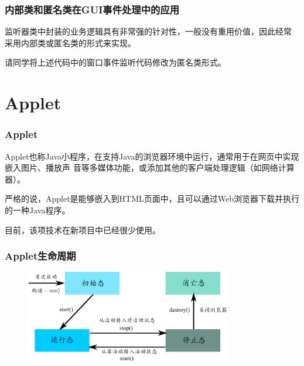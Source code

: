 \begin{frame}[fragile] %
  \frametitle{内部类和匿名类在GUI事件处理中的应用}

  监听器类中封装的业务逻辑具有非常强的针对性，一般没有重用价值，因此经常
  采用内部类或匿名类的形式来实现。


  
  请同学将上述代码中的窗口事件监听代码修改为匿名类形式。

\end{frame}

\section{Applet}

\begin{frame}[fragile] %
  \frametitle{Applet}

  
  Applet也称Java小程序，在支持Java的浏览器环境中运行，通常用于在网页中实现嵌入图片、播放声
  音等多媒体功能，或添加其他的客户端处理逻辑（如网络计算器）。

  {\hei 严格的说，Applet是能够嵌入到HTML页面中，且可以通过Web浏览器下载并执行的一种Java程序。}

  目前，该项技术在新项目中已经很少使用。

\end{frame}

\begin{frame}[fragile] 
  \frametitle{Applet生命周期}

  \begin{figure}
    \centering
    \includegraphics[width=0.8\textwidth]{figures/fig05.pdf}
  \end{figure}
\end{frame}


